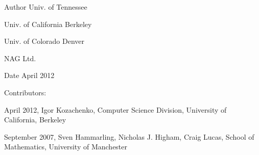 \begin{DoxyAuthor}{Author}
Univ. of Tennessee 

Univ. of California Berkeley 

Univ. of Colorado Denver 

N\+A\+G Ltd. 
\end{DoxyAuthor}
\begin{DoxyDate}{Date}
April 2012 
\end{DoxyDate}
\begin{DoxyParagraph}{Contributors\+: }
\begin{DoxyVerb}   April 2012, Igor Kozachenko,
                  Computer Science Division,
                  University of California, Berkeley

  September 2007, Sven Hammarling, Nicholas J. Higham, Craig Lucas,
                  School of Mathematics,
                  University of Manchester\end{DoxyVerb}
 
\end{DoxyParagraph}
\hypertarget{group__doubleSYsolve_ga183787a5a4cb471abe442815b0e44b35}{}
